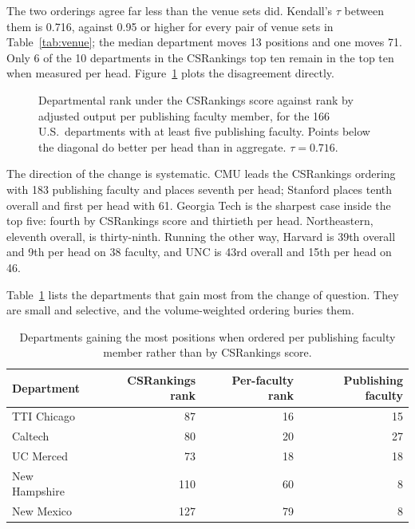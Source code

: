 \documentclass[11pt]{article}
\newcommand{\csr}{CSRankings}
\begin{document}
The two orderings agree far less than the venue sets did. Kendall's $\tau$
between them is 0.716, against 0.95 or higher for every pair of venue sets in
Table~\ref{tab:venue}; the median department moves 13 positions and one moves
71. Only 6 of the 10 departments in the \csr{} top ten remain in the top ten
when measured per head. Figure~\ref{fig:percapita} plots the disagreement
directly.

\begin{figure}[t]
\centering
{}
\caption{Departmental rank under the \csr{} score against rank by adjusted
output per publishing faculty member, for the 166 U.S.\ departments with at
least five publishing faculty. Points below the diagonal do better per head
than in aggregate. $\tau = 0.716$.}
\label{fig:percapita}
\end{figure}

The direction of the change is systematic. CMU leads the \csr{} ordering with
183 publishing faculty and places seventh per head; Stanford places tenth
overall and first per head with 61. Georgia Tech is the sharpest case inside
the top five: fourth by \csr{} score and thirtieth per head. Northeastern,
eleventh overall, is thirty-ninth. Running the other way, Harvard is 39th
overall and 9th per head on 38 faculty, and UNC is 43rd overall and 15th per
head on 46.

Table~\ref{tab:percapitagains} lists the departments that gain most from the
change of question. They are small and selective, and the volume-weighted
ordering buries them.

\begin{table}[t]
\centering
\caption{Departments gaining the most positions when ordered per publishing
faculty member rather than by \csr{} score.}
\label{tab:percapitagains}
\begin{tabular}{lrrr}
\toprule
Department & \csr{} rank & Per-faculty rank & Publishing faculty \\
\midrule
TTI Chicago    & 87  & 16 & 15 \\
Caltech        & 80  & 20 & 27 \\
UC Merced      & 73  & 18 & 18 \\
New Hampshire  & 110 & 60 & 8  \\
New Mexico     & 127 & 79 & 8  \\
\bottomrule
\end{tabular}
\end{table}
\end{document}
